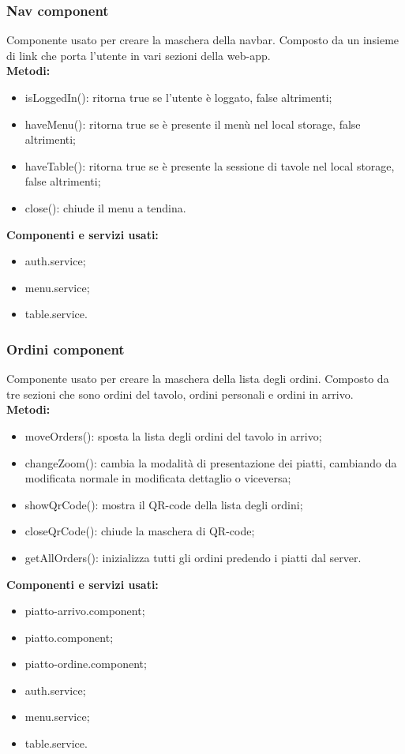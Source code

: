 \subsubsection{Nav component}
Componente usato per creare la maschera della navbar. Composto da un insieme di link che porta l'utente in vari sezioni della web-app.\\
\textbf{Metodi:}
\begin{itemize}
    \item isLoggedIn(): ritorna true se l'utente è loggato, false altrimenti;
    \item haveMenu(): ritorna true se è presente il menù nel local storage, false altrimenti;
    \item haveTable(): ritorna true se è presente la sessione di tavole nel local storage, false altrimenti;
    \item close(): chiude il menu a tendina.
\end{itemize}
\textbf{Componenti e servizi usati:}
\begin{itemize}    
    \item auth.service;
    \item menu.service;
    \item table.service.
\end{itemize}

\subsubsection{Ordini component}
Componente usato per creare la maschera della lista degli ordini. Composto da tre sezioni che sono ordini del tavolo, ordini personali e ordini in arrivo.\\
\textbf{Metodi:}
\begin{itemize}
    \item moveOrders(): sposta la lista degli ordini del tavolo in arrivo;
    \item changeZoom(): cambia la modalità di presentazione dei piatti, cambiando da modificata normale in modificata dettaglio o viceversa;
    \item showQrCode(): mostra il QR-code della lista degli ordini;
    \item closeQrCode(): chiude la maschera di QR-code;
    \item getAllOrders(): inizializza tutti gli ordini predendo i piatti dal server.
\end{itemize}
\textbf{Componenti e servizi usati:}
\begin{itemize}
    \item piatto-arrivo.component;
    \item piatto.component;
    \item piatto-ordine.component;
    \item auth.service;
    \item menu.service;
    \item table.service.
\end{itemize}

